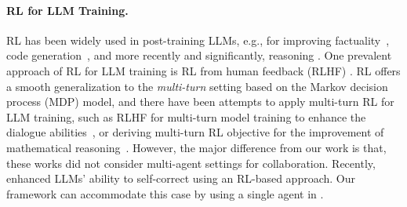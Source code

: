 \paragraph{RL for LLM Training. }
RL has been widely used in post-training  LLMs, e.g., for improving  factuality~\cite{tianfine}, code generation~\cite{le2022coderl}, and more recently and significantly, reasoning \cite{guo2025deepseek}. One prevalent approach of RL for LLM training is RL from human feedback (RLHF) 
\citep{ziegler2019fine, ouyang2022training,bai2022training, ahmadian-etal-2024-back}. 
RL offers a smooth generalization to the {\it multi-turn} setting  based on the Markov decision process (MDP) model, and there have been attempts to apply multi-turn RL for LLM training, such as RLHF for multi-turn model training to enhance the dialogue abilities~\citep{shani2024multi}, or deriving multi-turn RL objective for the improvement of mathematical reasoning~\cite{xiong2024building}. However, the major difference from  our work is that, these works did not consider multi-agent settings for collaboration. Recently, \citet{kumar2024training} enhanced LLMs' ability to self-correct using an RL-based approach. Our framework can accommodate this case by using a single agent in  \ourstwo.



